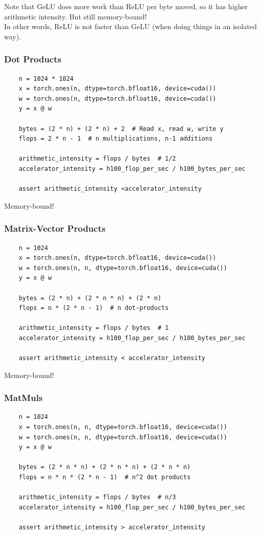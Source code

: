 \documentclass[12pt,twoside]{article}
\begin{document}
Note that GeLU does more work than ReLU per byte moved, so it has higher arithmetic intensity. But still memory-bound! \\

In other words, ReLU is not faster than GeLU (when doing things in an isolated way).

\subsubsection*{Dot Products}

\begin{verbatim}
    n = 1024 * 1024
    x = torch.ones(n, dtype=torch.bfloat16, device=cuda())
    w = torch.ones(n, dtype=torch.bfloat16, device=cuda())
    y = x @ w
    
    bytes = (2 * n) + (2 * n) + 2  # Read x, read w, write y
    flops = 2 * n - 1  # n multiplications, n-1 additions
    
    arithmetic_intensity = flops / bytes  # 1/2 
    accelerator_intensity = h100_flop_per_sec / h100_bytes_per_sec  
    
    assert arithmetic_intensity <accelerator_intensity
\end{verbatim}

Memory-bound!

\subsubsection*{Matrix-Vector Products}

\begin{verbatim}
    n = 1024
    x = torch.ones(n, dtype=torch.bfloat16, device=cuda())
    w = torch.ones(n, n, dtype=torch.bfloat16, device=cuda())
    y = x @ w
    
    bytes = (2 * n) + (2 * n * n) + (2 * n)
    flops = n * (2 * n - 1)  # n dot-products
    
    arithmetic_intensity = flops / bytes  # 1 
    accelerator_intensity = h100_flop_per_sec / h100_bytes_per_sec 
    
    assert arithmetic_intensity < accelerator_intensity
\end{verbatim}

Memory-bound!

\subsubsection*{MatMuls}

\begin{verbatim}
    n = 1024
    x = torch.ones(n, n, dtype=torch.bfloat16, device=cuda())
    w = torch.ones(n, n, dtype=torch.bfloat16, device=cuda())
    y = x @ w
    
    bytes = (2 * n * n) + (2 * n * n) + (2 * n * n)
    flops = n * n * (2 * n - 1)  # n^2 dot products
    
    arithmetic_intensity = flops / bytes  # n/3 
    accelerator_intensity = h100_flop_per_sec / h100_bytes_per_sec  
    
    assert arithmetic_intensity > accelerator_intensity
\end{verbatim}
\end{document}
